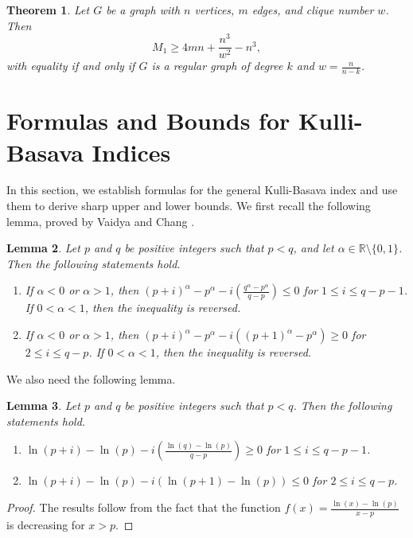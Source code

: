 \documentclass[10pt,a4paper]{amsart}
\newtheorem{theorem}{Theorem}[section]
\newtheorem{lemma}[theorem]{Lemma}
\numberwithin{equation}{section}
\begin{document}
\begin{theorem} Let $G$ be a graph with $n$ vertices, $m$ edges, and clique number $w$. Then
\[
M_1\geq 4mn+\frac{n^3}{w^2}-n^3,
\]
with equality if and only if $G$ is a regular graph of degree $k$ and $w=\frac{n}{n-k}$.
\end{theorem}

\section{Formulas and Bounds for Kulli-Basava Indices}

In this section, we establish formulas for the general Kulli-Basava index and use them to derive sharp upper and lower bounds. We first recall the following lemma, proved by Vaidya and Chang \cite{vaidya2024sharp}.

\begin{lemma}\label{Lemma}
Let $p$ and $q$ be positive integers such that $p<q$, and let $\alpha\in\mathbb{R}\setminus\{0,1\}$. Then the following statements hold.
\begin{enumerate}
\item If $\alpha<0$ or $\alpha>1$, then $(p+i)^\alpha-p^\alpha-i\left(\frac{q^\alpha-p^\alpha}{q-p}\right)\leq 0$ for $1\leq i\leq q-p-1$. If $0<\alpha<1$, then the inequality is reversed.

\item If $\alpha<0$ or $\alpha>1$, then $(p+i)^\alpha-p^\alpha-i((p+1)^\alpha-p^\alpha)\geq 0$ for $2\leq i\leq q-p$. If $0<\alpha<1$, then the inequality is reversed.

\end{enumerate}
\end{lemma}

We also need the following lemma.

\begin{lemma}\label{Lemma2}
Let $p$ and $q$ be positive integers such that $p<q$. Then the following statements hold.
\begin{enumerate}
\item $\ln(p+i)-\ln(p)-i\left(\frac{\ln(q)-\ln(p)}{q-p}\right)\geq 0$ for $1\leq i\leq q-p-1$.

\item $\ln(p+i)-\ln(p)-i(\ln(p+1)-\ln(p))\leq 0$ for $2\leq i\leq q-p$.

\end{enumerate}
\end{lemma}
\begin{proof}
The results follow from the fact that the function $f(x)=\frac{\ln(x)-\ln(p)}{x-p}$ is decreasing for $x>p$.
\end{proof}
\end{document}
